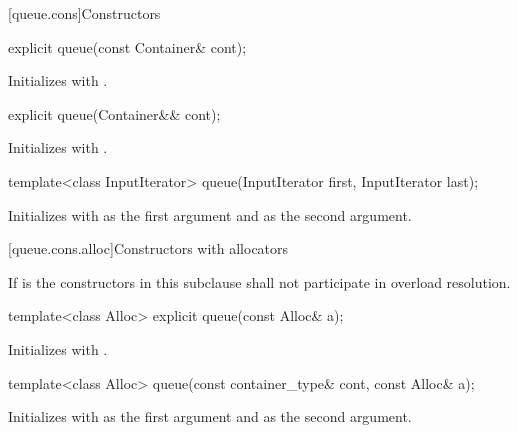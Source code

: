 [queue.cons]{Constructors}

%
\begin{itemdecl}
explicit queue(const Container& cont);
\end{itemdecl}

\begin{itemdescr}
\pnum
\effects
Initializes  with .
\end{itemdescr}

%
\begin{itemdecl}
explicit queue(Container&& cont);
\end{itemdecl}

\begin{itemdescr}
\pnum
\effects
Initializes  with .
\end{itemdescr}

%
\begin{itemdecl}
template<class InputIterator>
  queue(InputIterator first, InputIterator last);
\end{itemdecl}

\begin{itemdescr}
\pnum
\effects
Initializes  with
 as the first argument and  as the second argument.
\end{itemdescr}

[queue.cons.alloc]{Constructors with allocators}

\pnum
If  is 
the constructors in this subclause shall not participate in overload resolution.

%
\begin{itemdecl}
template<class Alloc> explicit queue(const Alloc& a);
\end{itemdecl}

\begin{itemdescr}
\pnum
\effects
Initializes  with .
\end{itemdescr}

%
\begin{itemdecl}
template<class Alloc> queue(const container_type& cont, const Alloc& a);
\end{itemdecl}

\begin{itemdescr}
\pnum
\effects
Initializes  with  as the first argument and 
as the second argument.
\end{itemdescr}

